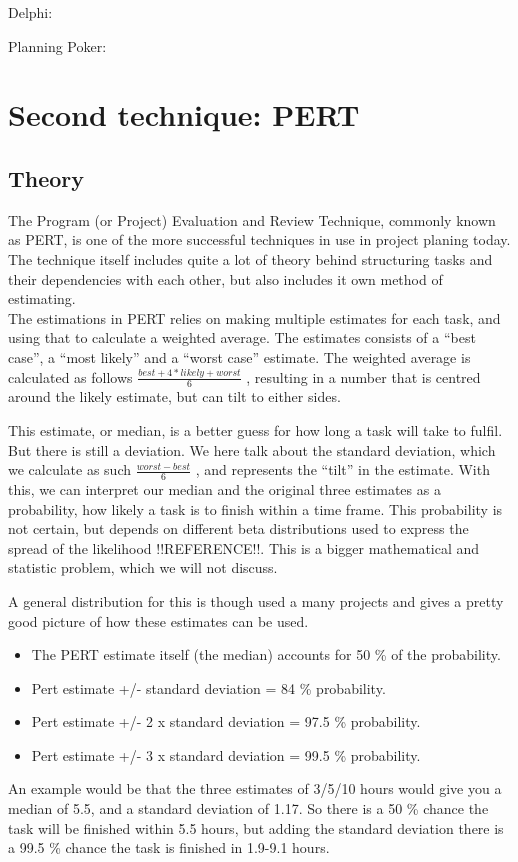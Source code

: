 Delphi:


Planning Poker:


\section{Second technique: PERT}
\subsection{Theory}

The Program (or Project) Evaluation and Review Technique, commonly known as PERT, is one of the more successful techniques in use in project planing today. The technique itself includes quite a lot of theory behind structuring tasks and their dependencies with each other, but also includes it own method of estimating.\\

The estimations in PERT relies on making multiple estimates for each task, and using that to calculate a weighted average. The estimates consists of a ``best case'', a ``most likely'' and a ``worst case'' estimate. The weighted average is calculated as follows
$\frac{best+4*likely+worst}{6}$
, resulting in a number that is centred around the likely estimate, but can tilt to either sides.\
 
This estimate, or median, is a better guess for how long a task will take to fulfil. But there is still a deviation. We here talk about the standard deviation, which we calculate as such
$\frac{worst-best}{6}$
, and represents the ``tilt'' in the estimate. With this, we can interpret our median and the original three estimates as a probability, how likely a task is to finish within a time frame. This probability is not certain, but depends on different beta distributions used to express the spread of the likelihood !!REFERENCE!!. This is a bigger mathematical and statistic problem, which we will not discuss.\

A general distribution for this is though used a many projects and gives a pretty good picture of how these estimates can be used.\
\begin{itemize}


\item The PERT estimate itself (the median) accounts for 50 \% of the probability.
\item Pert estimate +/- standard deviation = 84 \% probability.
\item Pert estimate +/- 2 x standard deviation = 97.5 \% probability.
\item Pert estimate +/- 3 x standard deviation = 99.5 \% probability.
\end{itemize}
An example would be that the three estimates of 3/5/10 hours would give you a median of 5.5, and a standard deviation of 1.17. So there is a 50 \% chance the task will be finished within 5.5 hours, but adding the standard deviation there is a 99.5 \% chance the task is finished in 1.9-9.1 hours.\\


